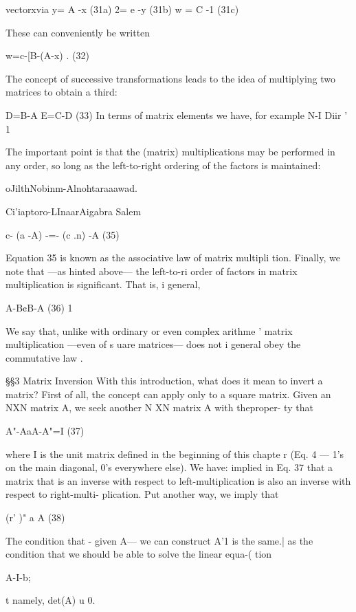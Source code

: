 {{{{{{{{vectorxvia
y= A -x (31a)
2= e -y (31b)
w = C -1 (31c)

These can conveniently be written

w=c-[B-(A-x) . (32)

 

The concept of successive transformations leads to the idea of
multiplying two matrices to obtain a third:

D=B-A E=C-D (33)
In terms of matrix elements we have, for example
N-I
Diir ' 1%

The important point is that the (matrix) multiplications may be
performed in any order, so long as the left-to-right ordering of
the factors is maintained:

oJilthNobinm-Alnohtaraaawad.

Ci'iaptoro-LInaarAigabra Salem

   
  
  
  
  

c- (a -A) -=- (c .n) -A (35)

Equation 35 is known as the associative law of matrix multipli
tion. Finally, we note that —as hinted above— the left-to-ri
order of factors in matrix multiplication is signiﬁcant. That is, i
general,

A-B¢B-A (36) 1

We say that, unlike with ordinary or even complex arithme '
matrix multiplication —even of s uare matrices— does not i
general obey the commutative law .

\S\S3 Matrix Inversion
With this introduction, what does it mean to invert a matrix? First
of all, the concept can apply only to a square matrix. Given an
NXN matrix A, we seek another N XN matrix A with theproper-
ty that

 

A"-AaA-A"=I (37)

where I is the unit matrix deﬁned in the beginning of this chapte r
(Eq. 4 — 1's on the main diagonal, 0's everywhere else). We have:
implied in Eq. 37 that a matrix that is an inverse with respect to
left-multiplication is also an inverse with respect to right-multi-
plication. Put another way, we imply that

(r' )" a A (38)

The condition that - given A— we can construct A'1 is the same.|
as the condition that we should be able to solve the linear equa-(
tion

A-I-b;

t namely, det(A) u 0.

}}}}}}}}
